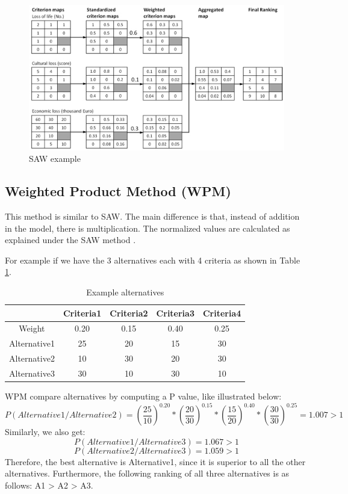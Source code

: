 \begin{figure}[ht]
  \includegraphics[width=\textwidth]{Figures/background/04_saw_method_web.jpg}
  \caption{SAW example \cite{SAWillustration}}
  \label{fig:SAW}
\end{figure}

\subsection{Weighted Product Method (WPM)}
This method is similar to SAW.
The main difference is that, instead of addition in the model, there is multiplication. The normalized values are calculated as explained under the SAW method \cite{WPM}. 

For example if we have the 3 alternatives each with 4 criteria as shown in
Table \ref{table:WPM_data}.
\begin{table}
\caption{Example alternatives \label{table:WPM_data}} 
\begin{center}
\begin{tabular}{ c c c c c }
\hline
&	Criteria1 &	Criteria2 &	Criteria3 &	Criteria4 \\
\hline
Weight &	0.20 &	0.15 &	0.40 &	0.25\\
\hline
Alternative1 &	25 &	20 &	15 &	30\\
Alternative2 &	10 &	30 &	20 &	30\\
Alternative3 &	30 &	10 &	30 &	10\\
\hline
\end{tabular}
\end{center}
\end{table}
WPM compare alternatives by computing a P value, like illustrated below:
$$
P(Alternative1/Alternative2)=
(\frac{25}{10})^{0.20}
*(\frac{20}{30})^{0.15}
*(\frac{15}{20})^{0.40}
*(\frac{30}{30})^{0.25}
=1.007 > 1
$$
Similarly, we also get:
$$
P(Alternative1/Alternative3)=1.067 > 1
$$
$$
P(Alternative2/Alternative3)=1.059 > 1
$$
Therefore, the best alternative is Alternative1, since it is superior to all the other alternatives. Furthermore, the following ranking of all three alternatives is as follows: A1 > A2 > A3.

